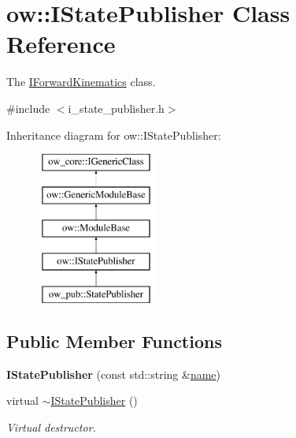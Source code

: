 \hypertarget{classow_1_1IStatePublisher}{}\section{ow\+:\+:I\+State\+Publisher Class Reference}
\label{classow_1_1IStatePublisher}


The \hyperlink{classow_1_1IForwardKinematics}{I\+Forward\+Kinematics} class.  




{\ttfamily \#include $<$i\+\_\+state\+\_\+publisher.\+h$>$}

Inheritance diagram for ow\+:\+:I\+State\+Publisher\+:\begin{figure}[H]
\begin{center}
\leavevmode
\includegraphics[height=5.000000cm]{d9/d8b/classow_1_1IStatePublisher}
\end{center}
\end{figure}
\subsection*{Public Member Functions}
\begin{DoxyCompactItemize}
\item 
{\bfseries I\+State\+Publisher} (const std\+::string \&\hyperlink{classow_1_1GenericModuleBase_a4b712883728cdbab7779e27f9a23689c}{name})\hypertarget{classow_1_1IStatePublisher_a48e08e4e9377db2e78d4fd348f4856f0}{}\label{classow_1_1IStatePublisher_a48e08e4e9377db2e78d4fd348f4856f0}

\item 
virtual \hyperlink{classow_1_1IStatePublisher_af3f82ab0f8e7733f856a9f7eed2ba767}{$\sim$\+I\+State\+Publisher} ()\hypertarget{classow_1_1IStatePublisher_af3f82ab0f8e7733f856a9f7eed2ba767}{}\label{classow_1_1IStatePublisher_af3f82ab0f8e7733f856a9f7eed2ba767}

\begin{DoxyCompactList}\small\item\em Virtual destructor. \end{DoxyCompactList}\end{DoxyCompactItemize}
